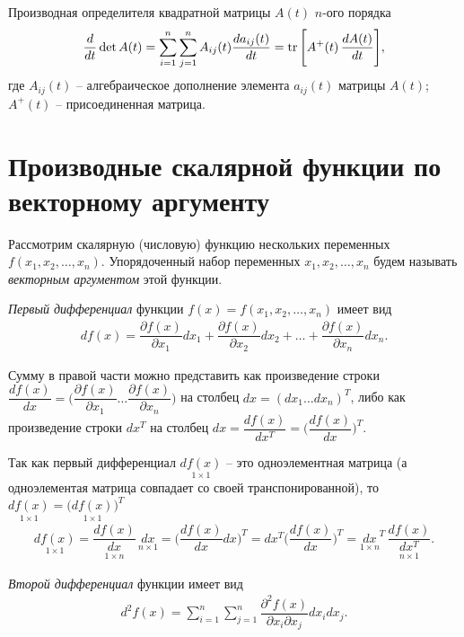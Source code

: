 \documentclass[%
	11pt,
	a4paper,
	utf8,
		]{article}
\begin{document}
Производная определителя квадратной матрицы $ A(t) $ $ n $-ого порядка
\begin{align*}
	\dfrac{d}{dt} \det A(t) = \sum_{i=1}^{n} \sum_{j=1}^{n} A_{ij}(t) \dfrac{d a_{ij}(t)}{dt} = \operatorname*{tr} \Bigg[ A^{+}(t) \, \dfrac{d A(t)}{dt} \Bigg],
\end{align*}
где $ A_{ij}(t) $ -- алгебраическое дополнение элемента $ a_{ij}(t) $ матрицы $ A(t) $; $ A^{+}(t) $ -- присоединенная матрица.


\section{Производные скалярной функции по векторному аргументу}

Рассмотрим скалярную (числовую) функцию нескольких переменных $ f(x_1, x_2, \ldots, x_n) $. Упорядоченный набор переменных $ x_1, x_2, \ldots, x_n $ будем называть \emph{векторным аргументом} этой функции.

\emph{Первый дифференциал} функции $ f(x) = f(x_1, x_2, \ldots, x_n) $ имеет вид
\begin{align*}
	df(x) = \dfrac{ \partial f(x) }{ \partial x_1 } dx_1 + \dfrac{ \partial f(x) }{ \partial x_2 } dx_2 + \ldots + \dfrac{ \partial f(x) }{ \partial x_n } dx_n.
\end{align*}

Сумму в правой части можно представить как произведение строки $ \dfrac{ df(x) }{dx} = \Big( \dfrac{\partial f(x)}{\partial x_1} \ldots \dfrac{\partial f(x)}{\partial x_n} \Big) $ на столбец $ dx = (dx_1 \ldots dx_n)^T $, либо как произведение строки $ dx^T $ на столбец $ dx = \dfrac{ df(x) }{dx^T} = \Big( \dfrac{df(x)}{dx} \Big)^T $.

Так как первый дифференциал $ \underset{1 \times 1}{df(x)} $ -- это одноэлементная матрица (а одноэлементая матрица совпадает со своей транспонированной), то $ \underset{1 \times 1}{df(x)} = \big(\underset{1 \times 1}{df(x)}\big)^T $
\begin{align*}
	\underset{1 \times 1}{df(x)} = \underset{1 \times n}{\dfrac{ df(x) }{ dx }} \, 
	\underset{n \times 1}{dx} = \Big( \dfrac{ df(x) }{dx} dx \Big)^T = dx^T \Big(\dfrac{df(x)}{dx}\Big)^T = \underset{1 \times n}{dx}^T \, \underset{n \times 1}{\dfrac{ df(x) }{dx^T}}.
\end{align*}

\emph{Второй дифференциал} функции имеет вид
\begin{align*}
	d^2f(x) = \sum_{i=1}^{n}\sum_{j=1}^{n} \dfrac{ \partial^2 f(x) }{ \partial x_i \partial x_j } dx_i dx_j.
\end{align*}
\end{document}
